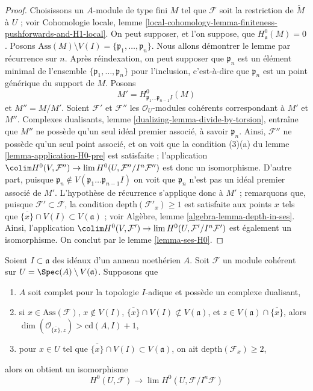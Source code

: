\begin{proof}
\medskip\noindent
Choisissons un $A$-module de type fini $M$ tel que $\mathcal{F}$ soit la restriction
de $\widetilde{M}$ à $U$ ; voir Cohomologie locale, lemme
\ref{local-cohomology-lemma-finiteness-pushforwards-and-H1-local}.
On peut supposer, et l'on suppose, que $H^0_\mathfrak a(M) = 0$.
Posons $\text{Ass}(M) \setminus V(I) = \{\mathfrak p_1, \ldots, \mathfrak p_n\}$.
Nous allons démontrer le lemme par récurrence sur $n$. Après réindexation, on
peut supposer que $\mathfrak p_n$ est un élément minimal de l'ensemble
$\{\mathfrak p_1, \ldots, \mathfrak p_n\}$ pour l'inclusion, c'est-à-dire que
$\mathfrak p_n$ est un point générique du support de $M$.
Posons
$$
M' = H^0_{\mathfrak p_1 \ldots \mathfrak p_{n - 1} I}(M)
$$
et $M'' = M/M'$. Soient $\mathcal{F}'$ et $\mathcal{F}''$ les
$\mathcal{O}_U$-modules cohérents correspondant à $M'$ et $M''$.
Complexes dualisants, lemme \ref{dualizing-lemma-divide-by-torsion},
entraîne que $M''$ ne possède qu'un seul idéal premier associé, à savoir $\mathfrak p_n$.
Ainsi, $\mathcal{F}''$ ne possède qu'un seul point associé, et
on voit que la condition (3)(a) du lemme \ref{lemma-application-H0-pre} est satisfaite ;
l'application $\colim H^0(V, \mathcal{F}'')
\to \lim H^0(U, \mathcal{F}''/I^n\mathcal{F}'')$ est donc un isomorphisme.
D'autre part, puisque
$\mathfrak p_n \not \in V(\mathfrak p_1 \ldots \mathfrak p_{n - 1} I)$
on voit que $\mathfrak p_n$ n'est pas un idéal premier associé de $M'$.
L'hypothèse de récurrence s'applique donc à $M'$ ; remarquons
que, puisque $\mathcal{F}' \subset \mathcal{F}$,
la condition $\text{depth}(\mathcal{F}'_x) \geq 1$ est satisfaite aux points $x$ tels que
$\overline{\{x\}} \cap V(I) \subset V(\mathfrak a)$ ; voir
Algèbre, lemme \ref{algebra-lemma-depth-in-ses}.
Ainsi, l'application
$\colim H^0(V, \mathcal{F}')
\to \lim H^0(U, \mathcal{F}'/I^n\mathcal{F}')$ est également un isomorphisme.
On conclut par le lemme \ref{lemma-ses-H0}.
\end{proof}

\begin{lemma}
\label{lemma-application-H0}
Soient $I \subset \mathfrak a$ des idéaux d'un anneau noethérien $A$.
Soit $\mathcal{F}$ un module cohérent sur
$U = \Spec(A) \setminus V(\mathfrak a)$.
Supposons que
\begin{enumerate}
\item $A$ soit complet pour la topologie $I$-adique et possède un complexe dualisant,
\item si $x \in \text{Ass}(\mathcal{F})$, $x \not \in V(I)$,
$\overline{\{x\}} \cap V(I) \not \subset V(\mathfrak a)$, et
$z \in V(\mathfrak a) \cap \overline{\{x\}}$, alors
$\dim(\mathcal{O}_{\overline{\{x\}}, z}) > \text{cd}(A, I) + 1$,
\item pour $x \in U$ tel que $\overline{\{x\}} \cap V(I) \subset V(\mathfrak a)$,
on ait $\text{depth}(\mathcal{F}_x) \geq 2$,
\end{enumerate}
alors on obtient un isomorphisme
$$
H^0(U, \mathcal{F})
\longrightarrow
\lim H^0(U, \mathcal{F}/I^n\mathcal{F})
$$
\end{lemma}

